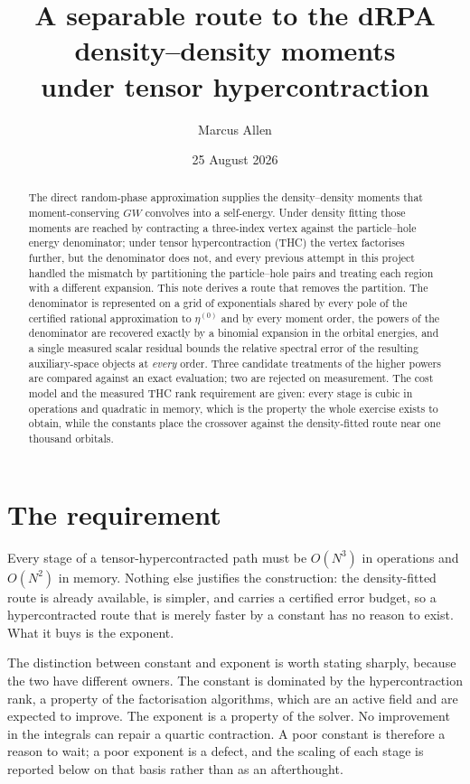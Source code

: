 \documentclass[11pt]{article}
\title{\vspace{-1.5cm}A separable route to the dRPA density--density moments\\
under tensor hypercontraction}
\author{Marcus Allen}
\date{25 August 2026}
\begin{document}
\maketitle
\vspace{-1.6cm}

\begin{abstract}
\noindent
The direct random-phase approximation supplies the density--density moments that
moment-conserving $GW$ convolves into a self-energy. Under density fitting those moments
are reached by contracting a three-index vertex against the particle--hole energy
denominator; under tensor hypercontraction (THC) the vertex factorises further, but the
denominator does not, and every previous attempt in this project handled the mismatch by
partitioning the particle--hole pairs and treating each region with a different expansion.
This note derives a route that removes the partition. The denominator is represented on a
grid of exponentials shared by every pole of the certified rational approximation to
$\eta^{(0)}$ and by every moment order, the powers of the denominator are recovered
exactly by a binomial expansion in the orbital energies, and a single measured scalar
residual bounds the relative spectral error of the resulting auxiliary-space objects at
\emph{every} order. Three candidate treatments of the higher powers are compared against an
exact evaluation; two are rejected on measurement. The cost model and the measured THC rank
requirement are given: every stage is cubic in operations and quadratic in memory, which
is the property the whole exercise exists to obtain, while the constants place the
crossover against the density-fitted route near one thousand orbitals.
\end{abstract}

\section*{The requirement}

Every stage of a tensor-hypercontracted path must be $O(N^3)$ in operations and $O(N^2)$
in memory. Nothing else justifies the construction: the density-fitted route is already
available, is simpler, and carries a certified error budget, so a hypercontracted route
that is merely faster by a constant has no reason to exist. What it buys is the exponent.

The distinction between constant and exponent is worth stating sharply, because the two
have different owners. The constant is dominated by the hypercontraction rank, a property
of the factorisation algorithms, which are an active field and are expected to improve.
The exponent is a property of the solver. No improvement in the integrals can repair a
quartic contraction. A poor constant is therefore a reason to wait; a poor exponent is a
defect, and the scaling of each stage is reported below on that basis rather than as an
afterthought.
\end{document}
